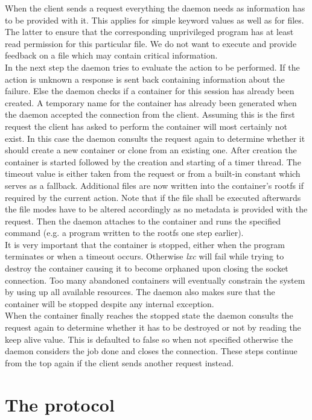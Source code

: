 When the client sends a request everything the daemon needs as information has to be provided with it.
This applies for simple keyword values as well as for files. The latter to ensure that
the corresponding unprivileged program has at least read permission for this particular file. We do
not want to execute and provide feedback on a file which may contain critical information.\\
In the next step the daemon tries to evaluate the action to be performed. If the action is unknown
a response is sent back containing information about the failure. Else the daemon checks if
a container for this session has already been created. A temporary name for the container has already
been generated when the daemon accepted the connection from the client. Assuming this is the first
request the client has asked to perform the container will most certainly not exist. In this case
the daemon consults the request again to determine whether it should create a new container or clone
from an existing one. After creation the container is started followed by the creation and starting of
a timer thread. The timeout value is either taken from the request or from a built-in constant
which serves as a fallback.
Additional files are now written into the container's rootfs if required by the current action.
Note that if the file shall be executed afterwards the file modes have to be altered accordingly as
no metadata is provided with the request.
Then the daemon attaches to the container and runs the specified command (e.g. a program written to
the rootfs one step earlier).\\
It is very important that the container is stopped, either when the program terminates or when a
timeout occurs. Otherwise \textit{lxc} will fail while trying to destroy the container causing it
to become orphaned upon closing the socket connection. Too many abandoned containers will eventually
constrain the system by using up all available resources. The daemon also makes sure that the container will be
stopped despite any internal exception.\\
When the container finally reaches the stopped state the daemon consults the request again to determine whether
it has to be destroyed or not by reading the keep alive value. This is defaulted to false so when
not specified otherwise the daemon considers the job done and closes the connection.
These steps continue from the top again if the client sends another request instead.

\section{The protocol}

